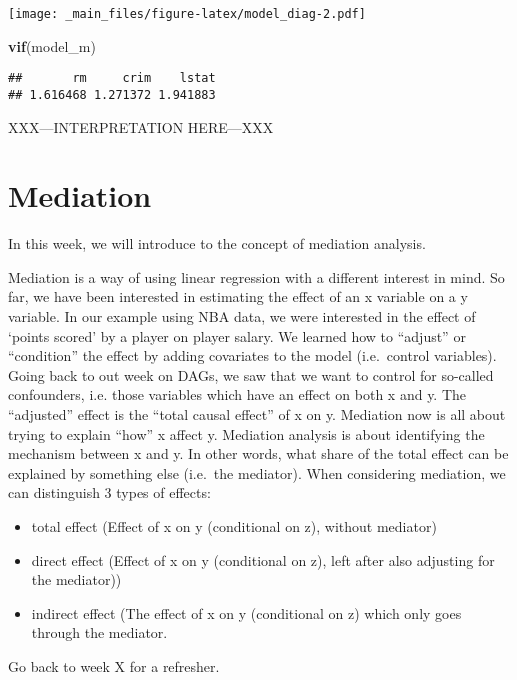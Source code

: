 \documentclass[
]{book}
\newenvironment{Shaded}{\begin{snugshade}}{\end{snugshade}}
\newcommand{\FunctionTok}[1]{\textcolor[rgb]{0.13,0.29,0.53}{\textbf{#1}}}
\newcommand{\NormalTok}[1]{#1}
\providecommand{\tightlist}{%
  \setlength{\itemsep}{0pt}\setlength{\parskip}{0pt}}
\begin{document}
\texttt{[image: \_main\_files/figure-latex/model\_diag-2.pdf]}

\begin{Shaded}
\begin{Highlighting}[]
\FunctionTok{vif}\NormalTok{(model\_m)}
\end{Highlighting}
\end{Shaded}

\begin{verbatim}
##       rm     crim    lstat 
## 1.616468 1.271372 1.941883
\end{verbatim}

XXX---INTERPRETATION HERE---XXX

\hypertarget{med}{%
\chapter{Mediation}\label{med}}

In this week, we will introduce to the concept of mediation analysis.

Mediation is a way of using linear regression with a different interest in mind.
So far, we have been interested in estimating the effect of an x variable on a
y variable. In our example using NBA data, we were interested in the effect of
`points scored' by a player on player salary. We learned how to ``adjust'' or ``condition''
the effect by adding covariates to the model (i.e.~control variables). Going back to
out week on DAGs, we saw that we want to control for so-called confounders, i.e.
those variables which have an effect on both x and y. The ``adjusted'' effect is the
``total causal effect'' of x on y.
Mediation now is all about trying to explain ``how'' x affect y. Mediation analysis
is about identifying the mechanism between x and y. In other words, what share
of the total effect can be explained by something else (i.e.~the mediator). When
considering mediation, we can distinguish 3 types of effects:

\begin{itemize}
\tightlist
\item
  total effect (Effect of x on y (conditional on z), without mediator)
\item
  direct effect (Effect of x on y (conditional on z), left after also adjusting for the mediator))
\item
  indirect effect (The effect of x on y (conditional on z) which only goes through the mediator.
\end{itemize}

Go back to week X for a refresher.
\end{document}
